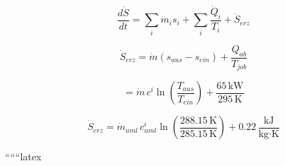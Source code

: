 \begin{equation}
\frac{d\dot{S}}{dt} = \sum_i \dot{m}_i s_i + \sum_i \frac{\dot{Q}_i}{T_i} + \dot{S}_{erz}
\end{equation}

\begin{equation}
\dot{S}_{erz} = \dot{m} (s_{aus} - s_{ein}) + \frac{Q_{ab}}{T_{job}}
\end{equation}

\begin{equation}
= \dot{m} \, c^{i} \ln \left( \frac{T_{aus}}{T_{ein}} \right) + \frac{65 \, \text{kW}}{295 \, \text{K}}
\end{equation}

\begin{equation}
\dot{S}_{erz} = \dot{m}_{uml} \, c^{i}_{uml} \ln \left( \frac{288.15 \, \text{K}}{285.15 \, \text{K}} \right) + 0.22 \, \frac{\text{kJ}}{\text{kg} \cdot \text{K}}
\end{equation}

``````latex


